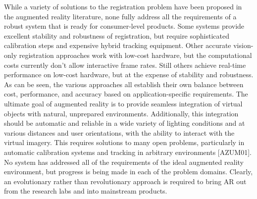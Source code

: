 While a variety of solutions to the registration problem have been proposed in the augmented reality literature, none fully address all the requirements of a robust system that is ready for consumer-level products. Some systems provide excellent stability and robustness of registration, but require sophisticated calibration steps and expensive hybrid tracking equipment. Other accurate vision-only registration approaches work with low-cost hardware, but the computational costs currently don’t allow interactive frame rates. Still others achieve real-time performance on low-cost hardware, but at the expense of stability and robustness. As can be seen, the various approaches all establish their own balance between cost, performance, and accuracy based on application-specific requirements. The ultimate goal of augmented reality is to provide seamless integration of virtual objects with natural, unprepared environments. Additionally, this integration should be automatic and reliable in a wide variety of lighting conditions and at various distances and user orientations, with the ability to interact with the virtual imagery. This requires solutions to many open problems, particularly in automatic calibration systems and tracking in arbitrary environments [AZUM01]. No system has addressed all of the requirements of the ideal augmented reality environment, but progress is being made in each of the problem domains. Clearly, an evolutionary rather than revolutionary approach is required to bring AR out from the research labs and into mainstream products.


